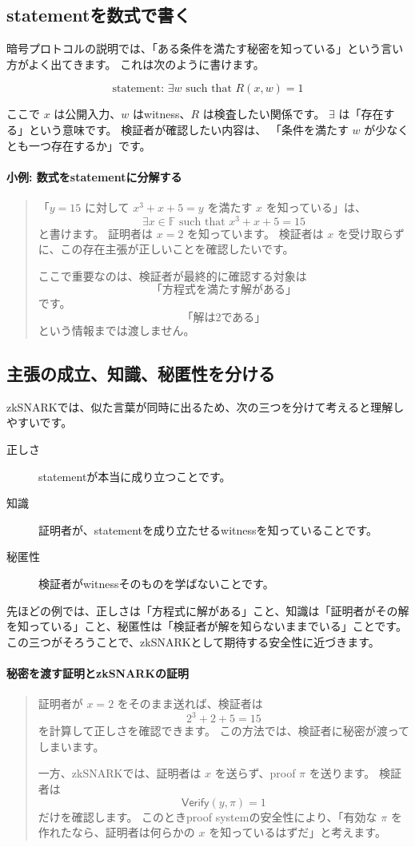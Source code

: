 \documentclass[a4paper,11pt]{ltjsarticle}
\newcommand{\F}{\mathbb{F}}
\newcommand{\Verify}{\mathsf{Verify}}
\newenvironment{examplebox}[1]{%
  \paragraph*{#1}\begin{quote}
}{%
  \end{quote}
}
\begin{document}
\subsection{statementを数式で書く}

暗号プロトコルの説明では、「ある条件を満たす秘密を知っている」という言い方がよく出てきます。
これは次のように書けます。

\[
  \text{statement: } \exists w \text{ such that } R(x,w)=1
\]

ここで \(x\) は公開入力、\(w\) はwitness、\(R\) は検査したい関係です。
\(\exists\) は「存在する」という意味です。
検証者が確認したい内容は、
「条件を満たす \(w\) が少なくとも一つ存在するか」です。

\begin{examplebox}{小例: 数式をstatementに分解する}
「\(y=15\) に対して \(x^3+x+5=y\) を満たす \(x\) を知っている」は、
\[
  \exists x \in \F \text{ such that } x^3+x+5=15
\]
と書けます。
証明者は \(x=2\) を知っています。
検証者は \(x\) を受け取らずに、この存在主張が正しいことを確認したいです。

ここで重要なのは、検証者が最終的に確認する対象は
\[
  \text{「方程式を満たす解がある」}
\]
です。
\[
  \text{「解は2である」}
\]
という情報までは渡しません。
\end{examplebox}

\subsection{主張の成立、知識、秘匿性を分ける}

zkSNARKでは、似た言葉が同時に出るため、次の三つを分けて考えると理解しやすいです。

\begin{description}
  \item[正しさ] statementが本当に成り立つことです。
  \item[知識] 証明者が、statementを成り立たせるwitnessを知っていることです。
  \item[秘匿性] 検証者がwitnessそのものを学ばないことです。
\end{description}

先ほどの例では、正しさは「方程式に解がある」こと、知識は「証明者がその解を知っている」こと、秘匿性は「検証者が解を知らないままでいる」ことです。
この三つがそろうことで、zkSNARKとして期待する安全性に近づきます。

\begin{examplebox}{秘密を渡す証明とzkSNARKの証明}
証明者が \(x=2\) をそのまま送れば、検証者は
\[
  2^3+2+5=15
\]
を計算して正しさを確認できます。
この方法では、検証者に秘密が渡ってしまいます。

一方、zkSNARKでは、証明者は \(x\) を送らず、proof \(\pi\) を送ります。
検証者は
\[
  \Verify(y,\pi)=1
\]
だけを確認します。
このときproof systemの安全性により、「有効な \(\pi\) を作れたなら、証明者は何らかの \(x\) を知っているはずだ」と考えます。
\end{examplebox}
\end{document}
